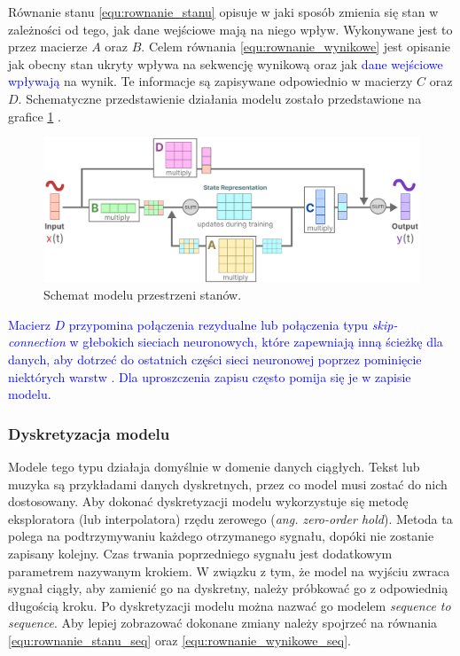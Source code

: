 \documentclass[data-science]{agh-wi} %
\begin{document}
Równanie stanu \ref*{equ:rownanie_stanu} opisuje w jaki sposób zmienia się stan w zależności od tego, jak dane wejściowe mają na niego wpływ. Wykonywane jest to przez macierze $A$ oraz $B$. Celem równania \ref*{equ:rownanie_wynikowe} jest opisanie jak obecny stan ukryty wpływa na sekwencję wynikową oraz jak \textcolor{blue}{dane wejściowe wpływają} na wynik. Te informacje są zapisywane odpowiednio w macierzy $C$ oraz $D$. Schematyczne przedstawienie działania modelu zostało przedstawione na grafice \ref*{fig:ssm_scheme} \cite*{mamba_guide}.

\begin{figure}[ht!]
    \begin{center}
        \includegraphics[width=0.9\linewidth]{./img/SSM_scheme.png}
    \end{center}
    \caption{Schemat modelu przestrzeni stanów.}\label{fig:ssm_scheme}
\end{figure}

\textcolor{blue}{Macierz $D$ przypomina połączenia rezydualne lub połączenia typu \textit{skip-connection} w głebokich sieciach neuronowych, które zapewniają inną ścieżkę dla danych, aby dotrzeć do ostatnich części sieci neuronowej poprzez pominięcie niektórych warstw \cite{resnet}. Dla uproszczenia zapisu często pomija się je w zapisie modelu}.

\subsubsection*{Dyskretyzacja modelu}
Modele tego typu działaja domyślnie w domenie danych ciągłych. Tekst lub muzyka są przykładami danych dyskretnych, przez co model musi zostać do nich dostosowany. Aby dokonać dyskretyzacji modelu wykorzystuje się metodę eksploratora (lub interpolatora) rzędu zerowego (\textit{ang. zero-order hold}). Metoda ta polega na podtrzymywaniu każdego otrzymanego sygnału, dopóki nie zostanie zapisany kolejny. Czas trwania poprzedniego sygnału jest dodatkowym parametrem nazywanym krokiem. W związku z tym, że model na wyjściu zwraca sygnał ciągły, aby zamienić go na dyskretny, należy próbkować go z odpowiednią długością kroku. Po dyskretyzacji modelu można nazwać go modelem \textit{sequence to sequence}. Aby lepiej zobrazować dokonane zmiany należy spojrzeć na równania \ref*{equ:rownanie_stanu_seq} oraz \ref*{equ:rownanie_wynikowe_seq}.
\end{document}
